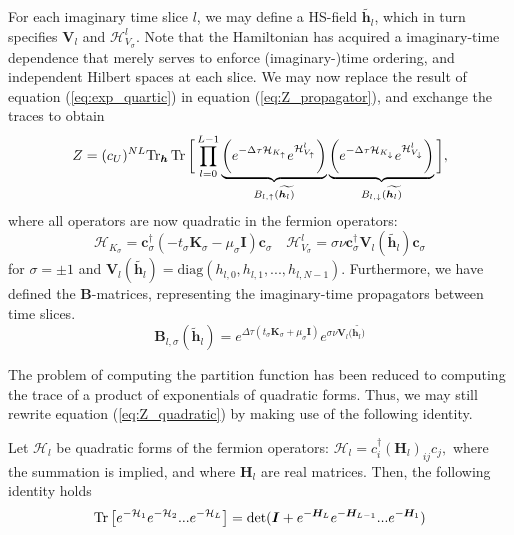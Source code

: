 For each imaginary time slice $l$, we may define a HS-field $\widetilde{\bm h_l}$, which in turn specifies $\bm V_l$ and $\mathcal{H}_{V_\sigma}^l$.
Note that the Hamiltonian has acquired a  imaginary-time dependence that merely serves to enforce (imaginary-)time ordering, and independent Hilbert spaces at each slice.
We may now replace the result of equation (\ref{eq:exp_quartic}) in equation (\ref{eq:Z_propagator}), and exchange the traces to obtain
\begin{equation}\label{eq:Z_quadratic}
Z  = (c_U)^{NL} \text{Tr}_{\bm h} \operatorname{Tr} \bigg[ \prod_{l=0}^{L-1} \underbrace{\bigg( e^{-\Delta\tau  \mathcal{H}_{K_\uparrow}} e^{\mathcal{H}_{V_\uparrow}^l} \bigg)}_{B_{l, \uparrow}(\widetilde{\bm h_l)}} \underbrace{\bigg( e^{-\Delta\tau  \mathcal{H}_{K_\downarrow}} e^{\mathcal{H}_{V_\downarrow}^l} \bigg)}_{B_{l, \downarrow}(\widetilde{\bm h_l)}} \bigg] ,
\end{equation}
where all operators are now quadratic in the fermion operators:
\begin{equation}
\mathcal{H}_{K_\sigma} = \bm c_\sigma^\dagger ( - t_\sigma \bm K_\sigma -\mu_\sigma \bm I ) \bm c_\sigma \quad \mathcal{H}_{V_\sigma}^l = \sigma \nu \bm c_\sigma^\dagger \bm V_l (\widetilde{\bm h_l}) \bm c_\sigma
\end{equation}
for $\sigma = \pm 1$ and $\bm V_l ( \widetilde{\bm h_l} ) = \text{diag} ( h_{l, 0} , h_{l, 1}, ... , h_{l, N-1} )$.
Furthermore, we have defined the $\bm B$-matrices, representing the imaginary-time propagators between time slices.
\begin{equation}
\bm B_{l, \sigma} ( \widetilde{\bm h}_l ) = e^{\Delta \tau ( t_\sigma \bm K_\sigma + \mu_\sigma \bm I)} e^{\sigma \nu \bm V_l (\widetilde{\bm h_l)}}
\end{equation}

The problem of computing the partition function has been reduced to computing the trace of a product of exponentials of quadratic forms.
Thus, we may still rewrite equation (\ref{eq:Z_quadratic}) by making use of the following identity.

Let $\mathcal{H}_l$ be quadratic forms of the fermion operators: 
$
\mathcal{H}_l = c_i^\dagger (\bm H_l)_{ij} c_j,
$
 where the summation is implied, and where $\bm H_l$ are real matrices.
Then, the following identity holds
\begin{equation}\label{eq:quadraticIdentity}
\operatorname{Tr} \big[ e^{-\mathcal{H}_1 } e^{-\mathcal{H}_2 } ... e^{-\mathcal{H}_L } \big] = \text{det} ( \bm I + e^{-\bm H_L} e^{-\bm H_{L-1}} ... e^{-\bm H_1} )
\end{equation}

